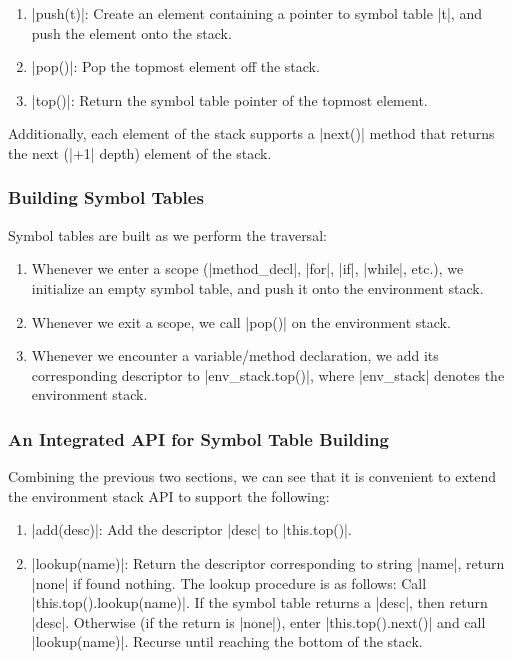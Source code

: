 \begin{enumerate}
    \item |push(t)|: Create an element containing a pointer to symbol table |t|, and push the element onto the stack.
    \item |pop()|: Pop the topmost element off the stack.
    \item |top()|: Return the symbol table pointer of the topmost element.
\end{enumerate}

Additionally, each element of the stack supports a |next()| method that returns the next (|+1| depth) element of the stack.

\subsubsection{Building Symbol Tables}

Symbol tables are built as we perform the traversal:

\begin{enumerate}
    \item Whenever we enter a scope (|method_decl|, |for|, |if|, |while|, etc.), we initialize an empty symbol table, and push it onto the environment stack.
    \item Whenever we exit a scope, we call |pop()| on the environment stack.
    \item Whenever we encounter a variable/method declaration, we add its corresponding descriptor to |env_stack.top()|, where |env_stack| denotes the environment stack.
\end{enumerate}

\subsubsection{An Integrated API for Symbol Table Building}

Combining the previous two sections, we can see that it is convenient to extend the environment stack API to support the following:

\begin{enumerate}
    \item |add(desc)|: Add the descriptor |desc| to |this.top()|.
    \item |lookup(name)|: Return the descriptor corresponding to string |name|, return |none| if found nothing. The lookup procedure is as follows: Call |this.top().lookup(name)|. If the symbol table returns a |desc|, then return |desc|. Otherwise (if the return is |none|), enter |this.top().next()| and call |lookup(name)|. Recurse until reaching the bottom of the stack.
\end{enumerate}

